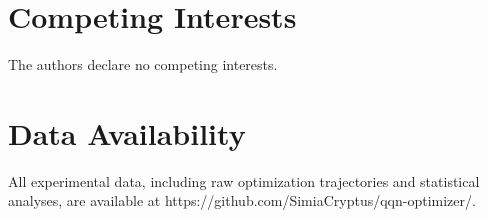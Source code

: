 \hypertarget{competing-interests}{%
\section{Competing Interests}\label{competing-interests}}

The authors declare no competing interests.

\hypertarget{data-availability}{%
\section{Data Availability}\label{data-availability}}

All experimental data, including raw optimization trajectories and statistical analyses, are available at https://github.com/SimiaCryptus/qqn-optimizer/.
